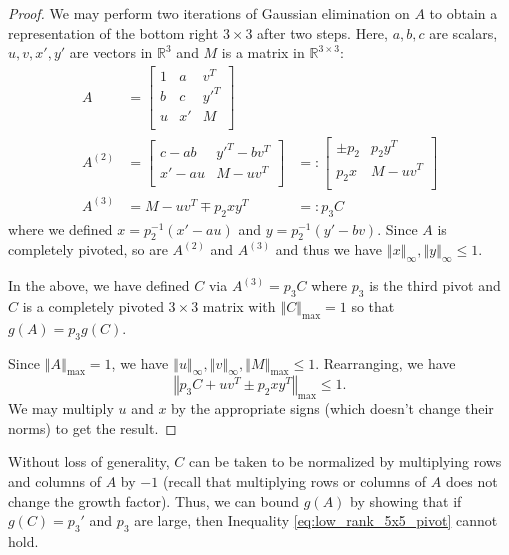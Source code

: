 \documentclass[reqno]{amsart}
\numberwithin{equation}{section}
\newcommand\R{\mathbb{R}}
\newcommand{\norm}[1]{\left\Vert #1 \right\Vert}
\begin{document}
\begin{proof}
    We may perform two iterations of Gaussian elimination on $A$ to obtain a representation of the bottom right $3 \times 3$ after two steps. Here, $a,b,c$ are scalars, $u,v,x',y'$ are vectors in $\R^3$ and $M$ is a matrix in $\R^{3 \times 3}$:
    \begin{align}
        A &= \begin{bmatrix}
            1 & a & v^T\\
            b & c & y'^T \\
            u & x' & M\\
        \end{bmatrix} \\ 
        A^{(2)} &= \begin{bmatrix}
            c-ab & y'^T - bv^T\\
            x'-au & M - uv^T\\
        \end{bmatrix} &=:
        \begin{bmatrix}
            \pm p_2 & p_2 y^T\\
            p_2 x & M - uv^T\\
        \end{bmatrix} \\
        A^{(3)} &= 
            M - uv^T \mp p_2 xy^T
         &=: p_3 C
    \end{align}
    where we defined $x = p_2^{-1}(x'-au)$ and $y = p_2^{-1}(y'-bv)$. Since $A$ is completely pivoted, so are $A^{(2)}$ and $A^{(3)}$ and thus we have $\norm{x}_\infty, \norm{y}_\infty \leq 1$.

    In the above, we have defined $C$ via $A^{(3)} = p_3 C$ where $p_3$ is the third pivot and $C$ is a completely pivoted $3 \times 3$ matrix with $\norm{C}_{\max} = 1$ so that $g(A) = p_3 g(C)$.

    Since $\norm{A}_{\max} = 1$, we have $\norm{u}_\infty, \norm{v}_\infty, \norm{M}_{\max} \leq 1$. Rearranging, we have 
    \begin{equation}
        \norm{p_3 C + uv^T \pm p_2 xy^T}_{\max} \leq 1.
    \end{equation}
    We may multiply $u$ and $x$ by the appropriate signs (which doesn't change their norms) to get the result.
\end{proof}

Without loss of generality, $C$ can be taken to be normalized by multiplying rows and columns of $A$ by $-1$ (recall that multiplying rows or columns of $A$ does not change the growth factor). Thus, we can bound $g(A)$ by showing that if $g(C) = p_3'$ and $p_3$ are large, then Inequality \eqref{eq:low_rank_5x5_pivot} cannot hold.
\end{document}
